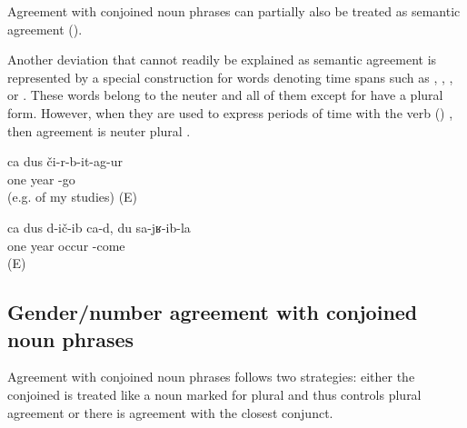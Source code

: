 Agreement with conjoined noun phrases can partially also be treated as semantic agreement ().

Another deviation that cannot readily be explained as semantic agreement is represented by a special construction for words denoting time spans such as  ,  ,  , or  . These words belong to the neuter   and all of them except for  have a plural form. However, when they are used to express periods of time with the verb  () , then agreement is neuter plural .
%
\begin{exe}
	\ex	\label{ex:‎One year finished (e.g. of my studies)}
	\gll	ca	dus	či-r-b-it-ag-ur\\
		one	year	-go\\
	\glt	{} (e.g. of my studies) (E)

	\ex	\label{ex:‎One year passed by since I came here}
	\gll	ca	dus	d-ič-ib	ca-d,	du	sa-jʁ-ib-la\\
		one	year	occur			-come\\
	\glt	{} (E)
\end{exe}



\subsection{Gender/number agreement with conjoined noun phrases}
\label{ssec:Gender agreement resolution}

Agreement with conjoined noun phrases follows two strategies: either the conjoined  is treated like a noun marked for plural and thus controls plural agreement or there is agreement with the closest conjunct.

